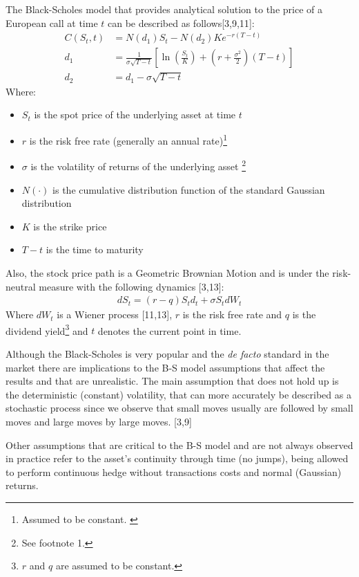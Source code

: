 \documentclass[12pt,twoside]{reedthesis}
\providecommand{\tightlist}{%
  \setlength{\itemsep}{0pt}\setlength{\parskip}{0pt}}
\theoremstyle{definition}
\theoremstyle{definition}
\theoremstyle{remark}
\begin{document}
  The Black-Scholes model that provides analytical solution to the price
  of a European call at time \(t\) can be described as
  follows{[}3,9,11{]}:
  \begin{align}
  C(S_{t},t)&=N(d_{1})S_{t}-N(d_{2})Ke^{-r(T-t)}\\[10pt]
  d_{1}&={\frac {1}{\sigma {\sqrt {T-t}}}}\left[\ln \left({\frac {S_{t}}{K}}\right)+\left(r+{\frac {\sigma ^{2}}{2}}\right)(T-t)\right]\\[10pt]
  d_{2}&=d_{1}-\sigma {\sqrt {T-t}}
  \end{align}
  \noindent
  Where:
  \begin{itemize}
  \tightlist
  \item
    \(S_{t}\) is the spot price of the underlying asset at time \(t\)
  \item
    \(r\) is the risk free rate (generally an annual
    rate)\footnote{Assumed to be constant. \label{teste}}
  \item
    \(\sigma\) is the volatility of returns of the underlying asset
    \footnote{See footnote 1.}
  \item
    \(N(\cdot )\) is the cumulative distribution function of the standard
    Gaussian distribution
  \item
    \(K\) is the strike price
  \item
    \(T-t\) is the time to maturity
  \end{itemize}
  \noindent
  Also, the stock price path is a Geometric Brownian Motion and is under
  the risk-neutral measure with the following dynamics {[}3,13{]}:
  \begin{align}
  dS_{t} = (r-q)S_td_t+\sigma S_t dW_t
  \end{align}
  \noindent
  Where \(dW_t\) is a Wiener process {[}11,13{]}, \(r\) is the risk free
  rate and \(q\) is the dividend
  yield\footnote{$r$ and $q$ are assumed to be constant.} and \(t\)
  denotes the current point in time.
  
  Although the Black-Scholes is very popular and the \emph{de facto}
  standard in the market there are implications to the B-S model
  assumptions that affect the results and that are unrealistic. The main
  assumption that does not hold up is the deterministic (constant)
  volatility, that can more accurately be described as a stochastic
  process since we observe that small moves usually are followed by small
  moves and large moves by large moves. {[}3,9{]}
  
  Other assumptions that are critical to the B-S model and are not always
  observed in practice refer to the asset's continuity through time (no
  jumps), being allowed to perform continuous hedge without transactions
  costs and normal (Gaussian) returns.
  
\end{document}
